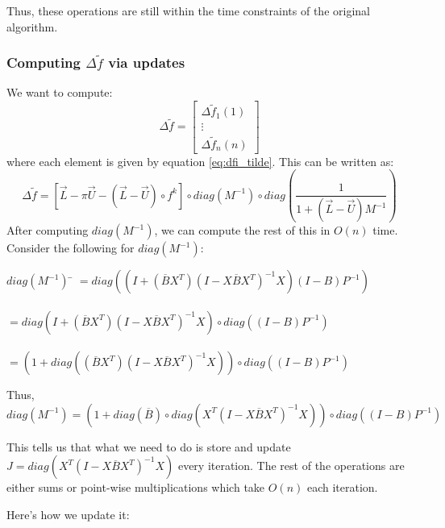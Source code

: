 \documentclass[12pt]{article}
\newcommand{\inv}[1]{#1^{-1}}
\begin{document}
			Thus, these operations are still within the time constraints of the original algorithm.

		\subsubsection{Computing $\Delta \widetilde{f}$ via updates}
			We want to compute:
			$$\Delta \widetilde{f} = \left[\begin{matrix}\Delta \widetilde{f}_1(1)\\ \vdots \\ \Delta\widetilde{f}_{n}(n)\end{matrix}\right]$$
			where each element is given by equation \ref{eq:dfi_tilde}. This can be written as:
			\begin{equation}
				\Delta \widetilde{f} = \left[\overrightarrow{L} - \pi\overrightarrow{U} - (\overrightarrow{L}-\overrightarrow{U})\circ f^k\right] \circ diag(\inv{M}) \circ diag\left(\dfrac{1}{1+(\overrightarrow{L}-\overrightarrow{U})\inv{M}}\right)
			\end{equation}
			After computing $diag(\inv{M})$, we can compute the rest of this in $O(n)$ time.
			Consider the following for $diag(\inv{M})$:
			\begin{tabbing}
				$diag(\inv{M})$ \= $=diag ((I+(\overline{B}X^T)\inv{(I-X\overline{B}X^T)}X)(I-B)\inv{P})$\\\\
				\>$=diag (I+(\overline{B}X^T)\inv{(I-X\overline{B}X^T)}X)\circ diag((I-B)\inv{P})$\\\\
				\>$=(1+diag ((\overline{B}X^T)\inv{(I-X\overline{B}X^T)}X))\circ diag((I-B)\inv{P})$
			\end{tabbing}
			Thus,
			\begin{equation}
				diag(\inv{M}) =(1+diag (\overline{B}) \circ diag (X^T\inv{(I-X\overline{B}X^T)}X))\circ diag((I-B)\inv{P})
			\end{equation}

			This tells us that what we need to do is store and update \\$J = diag (X^T\inv{(I-X\overline{B}X^T)}X)$ every iteration. The rest of the operations are either sums or point-wise multiplications which take $O(n)$ each iteration.

			Here's how we update it:
\end{document}
